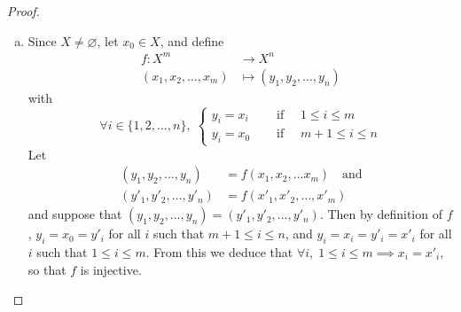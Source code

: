 \documentclass[11pt,a4paper,twoside]{article}
\theoremstyle{definition}
\begin{document}
\begin{proof}\hfill

  \begin{enumerate}[(a)]

  \item Since $X \neq \varnothing$, let $x_0 \in X$, and define
    \begin{align*}
      f : X^m &\to X^n \\
      (x_1, x_2, \dotsc, x_m) &\mapsto (y_1, y_2, \dotsc, y_n)
    \end{align*}
    with
    \begin{equation*}
      \forall i \in \{ 1, 2, \dotsc, n \}, \; \begin{cases}
        y_i = x_i \quad& \text{ if } \quad 1 \leq i \leq m \\
        y_i = x_0 \quad& \text{ if } \quad m + 1 \leq i \leq n
      \end{cases}
    \end{equation*}
    Let
    \begin{align*}
      (y_1, y_2, \dotsc, y_n) &= f (x_1, x_2, \dotsc x_m) \quad\text{and} \\
      (y'_1, y'_2, \dotsc, y'_n) &= f (x'_1, x'_2, \dotsc, x'_m)
    \end{align*}
    and suppose that $(y_1, y_2, \dotsc, y_n) = (y'_1, y'_2, \dotsc, y'_n)$.
    Then by definition of $f$, $y_i = x_0 = y'_i$ for all $i$ such that $m + 1 \leq i \leq n$,
    and $y_i = x_i = y'_i = x'_i$ for all $i$ such that $1 \leq i \leq m$. From this we deduce that
    $\forall i, \; 1 \leq i \leq m \implies x_i = x'_i$, so that $f$ is injective.


\end{enumerate}
\end{proof}
\end{document}
